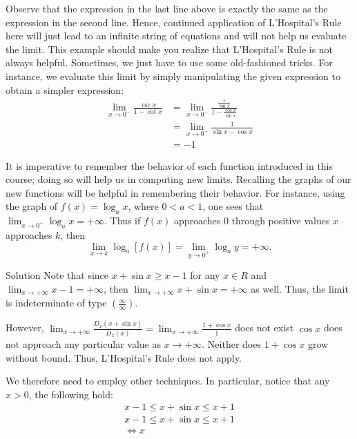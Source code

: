\documentclass[
  letterpaper,
  DIV=11,
  numbers=noendperiod]{scrartcl}
\begin{document}
Observe that the expression in the last line above is exactly the same
as the expression in the second line. Hence, continued application of
L'Hospital's Rule here will just lead to an infinite string of equations
and will not help us evaluate the limit. This example should make you
realize that L'Hospital's Rule is not always helpful. Sometimes, we just
have to use some old-fashioned tricks. For instance, we evaluate this
limit by simply manipulating the given expression to obtain a simpler
expression: \[
\begin{aligned}
\displaystyle\lim_{x \to 0^-}\frac{\csc x}{1-\cot x}&=\displaystyle\lim_{x \to 0^-}\frac{\frac{1}{\sin x}}{1-\frac{\cos x}{\sin x}}\\&=\displaystyle\lim_{x \to 0^-}\frac{1}{\sin x-\cos x}\\&=-1
\end{aligned}
\]

It is imperative to remember the behavior of each function introduced in
this course; doing so will help us in computing new limits. Recalling
the graphs of our new functions will be helpful in remembering their
behavior. For instance, using the graph of \(f(x)=\log_a x\), where
\(0\lt a \lt 1\), one sees that
\(\displaystyle\lim_{x \to 0^+}\log_a x=+\infty\). Thus if \(f(x)\)
approaches \(0\) through positive values \(x\) approaches \(k\), then \[
\displaystyle\lim_{x \to k}\log_a[f(x)]=\displaystyle\lim_{y \to 0^+}\log_a y=+\infty.
\]

\leavevmode{}%
Solution Note that since \(x+\sin x \ge x - 1\) for any \(x \in R\) and
\(\displaystyle\lim_{x \to +\infty} {x-1=+\infty}\), then
\(\displaystyle\lim_{x \to +\infty}{x + \sin x = +\infty}\) as well.
Thus, the limit is indeterminate of type
\(\left(\frac{\infty}{\infty}\right)\).

However,
\(\displaystyle\lim_{x \to +\infty}{\frac{D_x(x+\sin x)}{D_x(x)}=\displaystyle\lim_{x \to +\infty}\frac{1+\cos x}{1}}\)
does not exist \(\cos x\) does not approach any particular value as
\(x\to +\infty\). Neither does \(1+\cos x\) grow without bound. Thus,
L'Hospital's Rule does not apply.

We therefore need to employ other techniques. In particular, notice that
any \(x\gt 0\), the following hold: \[
\begin{aligned}
x-1 \le x+\sin x \le x+1 \\
x-1 \le x+\sin x \le x+1\\
\iff x
\end{aligned}
\]
\end{document}

